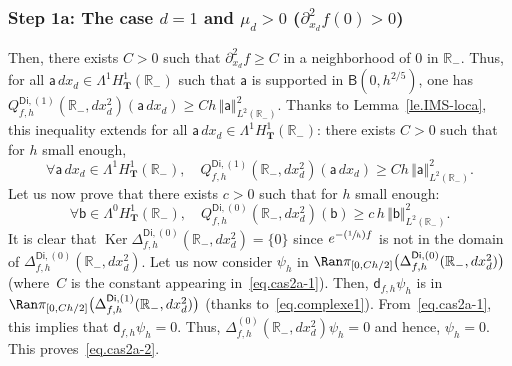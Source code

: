 \documentclass[10pt]{amsart}
\newcommand{\Psfrac}[2]{(\sfrac{#1}{#2})}
\newcommand{\mbf}[1]{\mathbf{#1}}
\DeclareMathOperator\Ker{Ker}
\theoremstyle{plain}
\theoremstyle{definition}
\begin{document}
\subsubsection*{Step 1a: The case $d=1$ and $\mu_{d}>0$ (\ie $ \partial_{x_d}^2 f(0)>0$)}
Then, there exists $C>0$ such that $\partial_{x_d}^2 f\ge C$ in a neighborhood of $0$ in $\mathbb R_-$.
Thus, for all $\mathsf a \, dx_d\in \Lambda^1 H^1_{\mbf T}(\mathbb R_-)$ such that $\mathsf a$ is supported in $\mathsf B(0,h^{2/5 })$, one has $
Q_{f,h}^{\mathsf{Di},(1)}(\mathbb R_-, dx_d^2)(\mathsf a \, dx_d)\ge Ch\, \Vert \mathsf a \Vert_{L^2(\mathbb R_-)}^2$.
Thanks to Lemma~\ref{le.IMS-loca}, this inequality extends for all $\mathsf a \, d x_d\in \Lambda^1 H^1_{\mbf T}(\mathbb R_-)$: there exists $C>0$ such that for $h$ small enough,
\begin{equation}\label{eq.cas2a-1}
\forall \mathsf a\, d x_d\in \Lambda^1 H^1_{\mbf T}(\mathbb R_-), \quad Q_{f,h}^{\mathsf{Di},(1)}(\mathbb R_-, dx_d^2)(\mathsf a \, dx_d)\ge Ch\, \Vert \mathsf a \Vert_{L^2(\mathbb R_-)}^2.
\end{equation}
Let us now prove that there exists $c>0$ such that for $h$ small enough:
\begin{equation}\label{eq.cas2a-2}
\forall \mathsf b\in \Lambda^0 H^1_{\mbf T}(\mathbb R_-),\quad Q_{f,h}^{\mathsf{Di},(0)}(\mathbb R_-, dx_d^2)(\mathsf b)\ge c \, h\, \Vert \mathsf b \Vert_{L^2(\mathbb R_-)}^2.
\end{equation}
It is clear that $\Ker \Delta_{f,h}^{\mathsf{Di},(0)}(\mathbb R_-,
dx_d^2)=\{0\}$ since $e^{-\Psfrac 1hf}$ is not in the domain of
$\Delta_{f,h}^{\mathsf{Di},(0)}(\mathbb R_-, dx_d^2)$. Let us now
consider $\psi_h$ in $\Ran \pi_{[0,Ch/2]}\bigl(\Delta_{f,h}^{\mathsf{Di},(0)}(\mathbb R_-,dx_d^2)\bigr)$
(where~$C$ is the constant appearing in~\eqref{eq.cas2a-1}). Then,
$\mathsf d_{f,h} \psi_h$ is in $\Ran \pi_{[0,Ch/2]}
\bigl(\Delta_{f,h}^{\mathsf{Di},(1)}(\mathbb R_-,dx_d^2) \bigr) $ (thanks to~\eqref{eq.complexe1}). From~\eqref{eq.cas2a-1}, this implies that $\mathsf d_{f,h}\psi_h=0$. Thus, $\Delta_{f,h}^{(0)}(\mathbb R_-, dx_d^2)\psi_h=0$ and hence, $\psi_h=0$. This proves~\eqref{eq.cas2a-2}.
\end{document}
